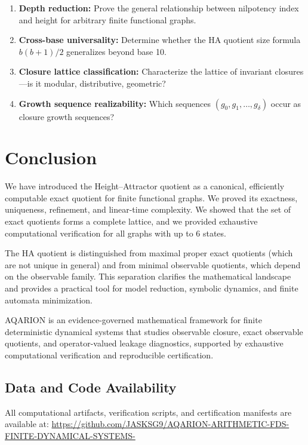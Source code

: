 \documentclass[11pt, a4paper]{article}
\theoremstyle{definition}
\theoremstyle{remark}
\begin{document}
\begin{enumerate}
\item \textbf{Depth reduction:} Prove the general relationship between nilpotency index and height for arbitrary finite functional graphs.
\item \textbf{Cross-base universality:} Determine whether the HA quotient size formula \(b(b+1)/2\) generalizes beyond base 10.
\item \textbf{Closure lattice classification:} Characterize the lattice of invariant closures—is it modular, distributive, geometric?
\item \textbf{Growth sequence realizability:} Which sequences \((g_0, g_1, \dots, g_\delta)\) occur as closure growth sequences?
\end{enumerate}

\section{Conclusion}

We have introduced the Height–Attractor quotient as a canonical, efficiently computable exact quotient for finite functional graphs. We proved its exactness, uniqueness, refinement, and linear-time complexity. We showed that the set of exact quotients forms a complete lattice, and we provided exhaustive computational verification for all graphs with up to 6 states.

The HA quotient is distinguished from maximal proper exact quotients (which are not unique in general) and from minimal observable quotients, which depend on the observable family. This separation clarifies the mathematical landscape and provides a practical tool for model reduction, symbolic dynamics, and finite automata minimization.

AQARION is an evidence-governed mathematical framework for finite deterministic dynamical systems that studies observable closure, exact observable quotients, and operator-valued leakage diagnostics, supported by exhaustive computational verification and reproducible certification.

\subsection*{Data and Code Availability}

All computational artifacts, verification scripts, and certification manifests are available at:
\url{https://github.com/JASKSG9/AQARION-ARITHMETIC-FDS-FINITE-DYNAMICAL-SYSTEMS-}
\end{document}
